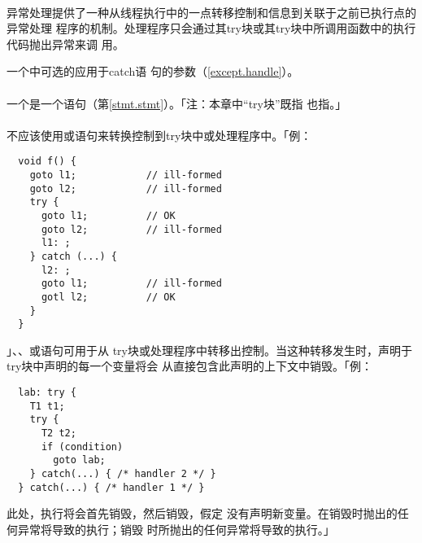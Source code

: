 
\paragraph{}
异常处理提供了一种从线程执行中的一点转移控制和信息到关联于之前已执行点的异常处理
程序的机制。处理程序只会通过其try块或其try块中所调用函数中的执行代码抛出异常来调
用。


一个中可选的应用于catch语
句的参数（\ref{except.handle}）。

\paragraph{}
一个是一个语句（第\ref{stmt.stmt}）。「注：本章中``try块''既指
也指。」

\paragraph{}
不应该使用或语句来转换控制到try块中或处理程序中。「例：
\begin{lstlisting}
  void f() {
    goto l1;            // ill-formed
    goto l2;            // ill-formed
    try {
      goto l1;          // OK
      goto l2;          // ill-formed
      l1: ;
    } catch (...) {
      l2: ;
      goto l1;          // ill-formed
      gotl l2;          // OK
    }
  }
\end{lstlisting}」、、或语句可用于从
try块或处理程序中转移出控制。当这种转移发生时，声明于try块中声明的每一个变量将会
从直接包含此声明的上下文中销毁。「例：
\begin{lstlisting}
  lab: try {
    T1 t1;
    try {
      T2 t2;
      if (condition)
        goto lab;
    } catch(...) { /* handler 2 */ }
  } catch(...) { /* handler 1 */ }
\end{lstlisting}
此处，执行将会首先销毁，然后销毁，假定
没有声明新变量。在销毁时抛出的任何异常将导致的执行；销毁
时所抛出的任何异常将导致的执行。」

